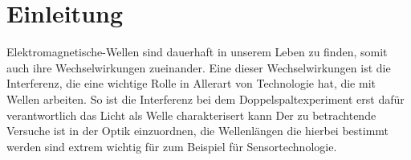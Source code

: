 \section{Einleitung}

Elektromagnetische-Wellen sind dauerhaft in unserem Leben zu finden, somit auch ihre Wechselwirkungen zueinander.
Eine dieser Wechselwirkungen ist die Interferenz, die eine wichtige Rolle in Allerart von Technologie hat, die mit Wellen arbeiten. 
So ist die Interferenz bei dem Doppelspaltexperiment erst dafür verantwortlich das Licht als Welle charakterisert kann
Der zu betrachtende Versuche ist in der Optik einzuordnen, die Wellenlängen die hierbei bestimmt werden sind extrem wichtig für zum Beispiel für Sensortechnologie.